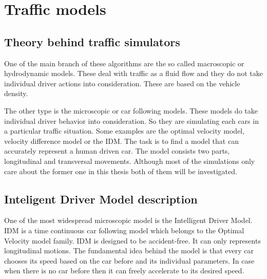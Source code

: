 \documentclass[a4paper,11pt,twoside]{report}
\begin{document}
	\chapter{Traffic models}
		\section{Theory behind traffic simulators}
			One of the main branch of these algorithms are the so called macroscopic or hydrodynamic models. These deal with traffic as a fluid flow and they do not take individual driver actions into consideration. These are based on the vehicle density.

			The other type is the microscopic or car following models. These models do take individual driver behavior into consideration. So they are simulating each cars in a particular traffic situation. Some examples are the optimal velocity model, velocity difference model or the IDM. The task is to find a model that can accurately represent a human driven car. The model consists two parts, longitudinal and transversal movements. Although most of the simulations only care about the former one in this thesis both of them will be investigated.
		\section{Inteligent Driver Model description} \label{sec:IDM}
			One of the most widespread microscopic model is the Intelligent Driver Model. IDM is a time continuous car following model which belongs to the Optimal Velocity model family. IDM is designed to be accident-free. It can only represents longitudinal motions. The fundamental idea behind the model is that every car chooses its speed based on the car before and its individual parameters. In case when there is no car before then it can freely accelerate to its desired speed.
\end{document}
